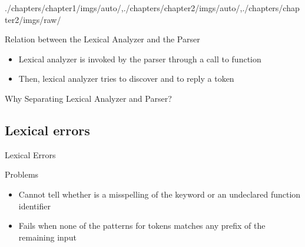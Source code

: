\begin{graphicspathcontext}{{./chapters/chapter1/imgs/auto/},{./chapters/chapter2/imgs/auto/},{./chapters/chapter2/imgs/raw/}}
\begin{bibunit}[apalike]
\begin{frame}{Relation between the Lexical Analyzer and the Parser}
	\vspace{.5cm}
	\begin{center}
	\end{center}
	\vspace{.5cm}
	\begin{itemize}
	\item Lexical analyzer is invoked by the parser through a call to  function
	\item Then, lexical analyzer tries to discover and to reply a token
	\end{itemize}
\end{frame}

\begin{frame}{{Why Separating} Lexical Analyzer and Parser?}
	\hfill
	\hfill
\end{frame}

\subsection{Lexical errors}
\subsectiontableofcontentslide

\begin{frame}[t]{Lexical Errors}
	\vspace{.25cm}
	\begin{example}
	\end{example}
	\vspace{.25cm}
	\begin{alertblock}{Problems}
		\begin{itemize}
		\item Cannot tell whether  is a misspelling of the keyword  or an undeclared function identifier
		\item Fails when none of the patterns for tokens matches any prefix of the remaining input
		\end{itemize}
	\end{alertblock}
	\vspace{.25cm}
\end{frame}


\end{bibunit}
\end{graphicspathcontext}
